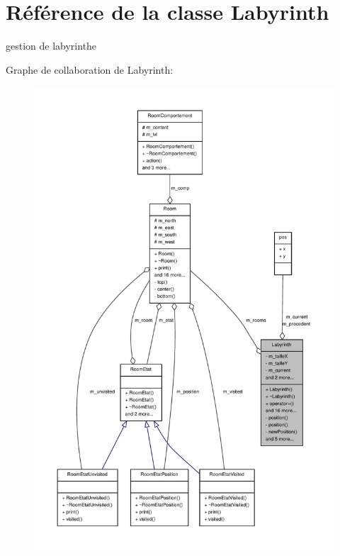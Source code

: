 \section{Référence de la classe Labyrinth}
\label{class_labyrinth}


gestion de labyrinthe  




Graphe de collaboration de Labyrinth\-:\nopagebreak
\begin{figure}[H]
\begin{center}
\leavevmode
\includegraphics[width=350pt]{class_labyrinth__coll__graph}
\end{center}
\end{figure}

